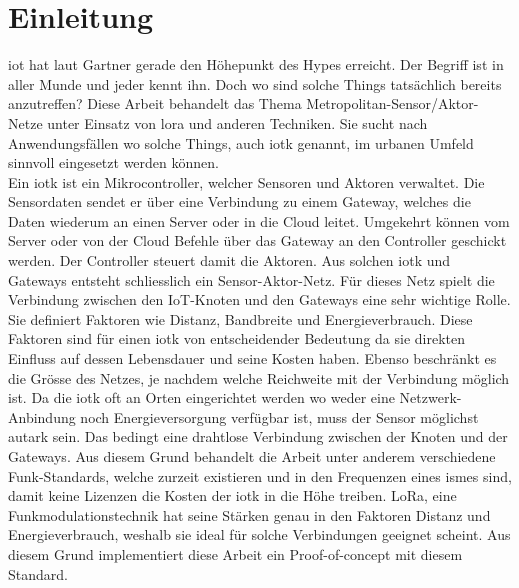 \chapter{Einleitung}

\acrfull{iot} hat laut Gartner\autocite{gartner:iotHype} gerade den Höhepunkt des Hypes erreicht. Der Begriff ist in aller Munde und jeder kennt ihn. Doch wo sind solche \glqq{}Things\grqq{} tatsächlich bereits anzutreffen? Diese Arbeit behandelt das Thema \glqq{}Metropolitan-Sensor/Aktor-Netze unter Einsatz von \gls{lora} und anderen Techniken\grqq{}. Sie sucht nach Anwendungsfällen wo solche Things, auch \gls{iotk} genannt, im urbanen Umfeld sinnvoll eingesetzt werden können.\\
Ein \gls{iotk} ist ein Mikrocontroller, welcher Sensoren und Aktoren verwaltet. Die Sensordaten sendet er über eine Verbindung zu einem Gateway, welches die Daten wiederum an einen Server oder in die Cloud leitet. Umgekehrt können vom Server oder von der Cloud Befehle über das Gateway an den Controller geschickt werden. Der Controller steuert damit die Aktoren. Aus solchen \gls{iotk} und  Gateways entsteht schliesslich ein Sensor-Aktor-Netz. Für dieses Netz spielt die Verbindung zwischen den IoT-Knoten und den Gateways eine sehr wichtige Rolle. Sie definiert Faktoren wie Distanz, Bandbreite und Energieverbrauch. Diese Faktoren sind für einen \gls{iotk} von entscheidender Bedeutung da sie direkten Einfluss auf dessen Lebensdauer und seine Kosten haben. Ebenso beschränkt es die Grösse des Netzes, je nachdem welche Reichweite mit der Verbindung möglich ist. Da die \gls{iotk} oft an Orten eingerichtet werden wo weder eine Netzwerk-Anbindung noch Energieversorgung verfügbar ist, muss der Sensor möglichst autark sein. Das bedingt eine drahtlose Verbindung zwischen der Knoten und der Gateways. Aus diesem Grund behandelt die Arbeit unter anderem verschiedene Funk-Standards, welche zurzeit existieren und in den Frequenzen eines \gls{ism}es sind, damit keine Lizenzen die Kosten der \gls{iotk} in die Höhe treiben. LoRa, eine Funkmodulationstechnik hat seine Stärken genau in den Faktoren Distanz und Energieverbrauch, weshalb sie ideal für solche Verbindungen geeignet scheint. Aus diesem Grund implementiert diese Arbeit ein Proof-of-concept mit diesem Standard. 